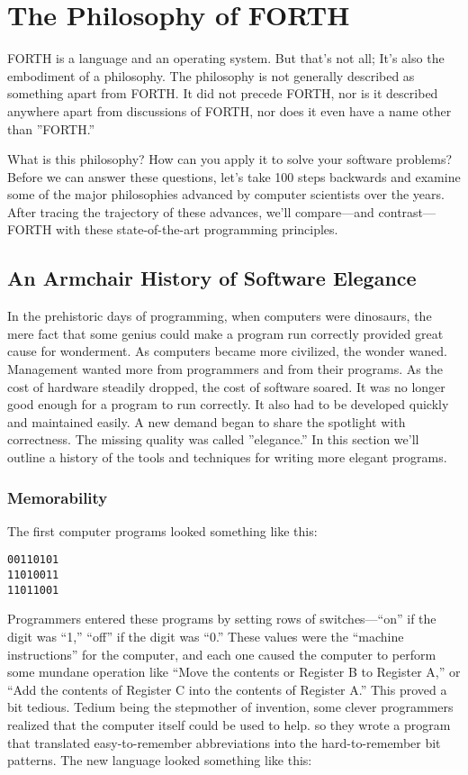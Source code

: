 \chapter{The Philosophy of FORTH}


FORTH is a language and an operating system. But that's not all; It's
also the embodiment of a philosophy. The philosophy is not generally
described as something apart from FORTH. It did not precede FORTH,
nor is it described anywhere apart from discussions of FORTH, nor
does it even have a name other than ''FORTH.''

What is this philosophy? How can you apply it to solve your software
problems? Before we can answer these questions, let's take 100 steps
backwards and examine some of the major philosophies advanced by computer
scientists over the years. After tracing the trajectory of these advances,
we'll compare---and contrast---FORTH with these state-of-the-art programming
principles.


\section{An Armchair History of Software Elegance}

In the prehistoric days of programming, when computers were dinosaurs,
the mere fact that some genius could make a program run correctly
provided great cause for wonderment. As computers became more civilized,
the wonder waned. Management wanted more from programmers and from
their programs. As the cost of hardware steadily dropped, the cost
of software soared. It was no longer good enough for a program to
run correctly. It also had to be developed quickly and maintained
easily. A new demand began to share the spotlight with correctness.
The missing quality was called ''elegance.'' In this section we'll
outline a history of the tools and techniques for writing more elegant
programs.


\subsection{Memorability}

The first computer programs looked something like this:

\begin{verbatim}
00110101
11010011
11011001
\end{verbatim}
Programmers entered these programs by setting rows of switches---``on''
if the digit was {}``1,'' ``off'' if the digit was ``0.'' These
values were the {}``machine instructions'' for the computer, and
each one caused the computer to perform some mundane operation like
``Move the contents or Register B to Register A,'' or {}``Add the
contents of Register C into the contents of Register A.'' This proved
a bit tedious. Tedium being the stepmother of invention, some clever
programmers realized that the computer itself could be used to help.
so they wrote a program that translated easy-to-remember abbreviations
into the hard-to-remember bit patterns. The new language looked something
like this:

